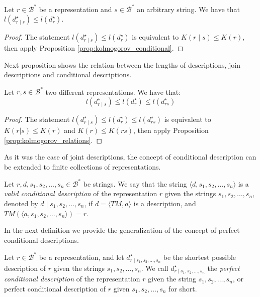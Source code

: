 \begin{proposition}
\label{prop:description_conditional_inequality}
Let $r \in \mathcal{B}^\ast$ be a representation and $s \in \mathcal{B}^\ast$ an arbitrary string. We have that $l \left( d^\star_{r \mid s} \right) \leq l \left( d^\star_r \right)$.
\end{proposition}
\begin{proof}
The statement $l \left( d^\star_{r \mid s} \right) \leq l \left( d^\star_r \right)$ is equivalent to $K(r \mid s) \leq K(r)$, then apply Proposition \ref{prop:kolmogorov_conditional}.
\end{proof}

Next proposition shows the relation between the lengths of descriptions, join descriptions and conditional descriptions.

\begin{proposition}
\label{prop:description_conditional_joint}
Let $r, s \in \mathcal{B}^\ast$ two different representations. We have that:
\[
l \left( d^\star_{r \mid s} \right) \leq l \left( d^\star_r \right) \leq l \left( d^\star_{rs} \right)
\]
\end{proposition}
\begin{proof}
The statement $l \left( d^\star_{r \mid s} \right) \leq l \left( d^\star_r \right) \leq l \left( d^\star_{rs} \right)$ is equivalent to $K(r | s ) \leq K(r)$ and $K(r) \leq K(rs)$, then apply Proposition \ref{prop:kolmogorov_relations}.
\end{proof}

As it was the case of joint descriptions, the concept of conditional description can be extended to finite collections of representations.

\begin{definition}
Let $r, d, s_1, s_2, \ldots, s_n \in \mathcal{B}^\ast$ be strings. We say that the string $\langle d, s_1, s_2, \ldots, s_n \rangle$ is a \emph{valid conditional description} of the representation $r$ given the strings $s_1, s_2, \ldots, s_n$, denoted by $d \mid s_1, s_2, \ldots, s_n$, if $d = \langle TM, a \rangle$ is a description, and $TM \left(\langle a, s_1, s_2, \ldots, s_n \rangle \right) = r$.
\end{definition}

In the next definition we provide the generalization of the concept of perfect conditional descriptions.

\begin{definition}
Let $r \in \mathcal{B}^\ast$ be a representation, and let $d^\star_{r \mid s_1, s_2, \ldots, s_n}$ be the shortest possible description of $r$ given the strings $s_1, s_2, \ldots, s_n$. We call $d^\star_{r \mid s_1, s_2, \ldots, s_n}$ the \emph{perfect conditional description} of the representation $r$ given the string $s_1, s_2, \ldots, s_n$, or perfect conditional description of $r$ given $s_1, s_2, \ldots, s_n$ for short.
\end{definition}

